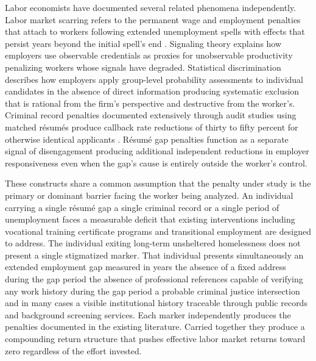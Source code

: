 \documentclass[12pt, letterpaper]{article}
\begin{document}
Labor economists have documented several related phenomena independently. Labor market scarring refers to the permanent wage and employment penalties that attach to workers following extended unemployment spells with effects that persist years beyond the initial spell's end \citep{arulampalam2001unemployment}. Signaling theory \citep{spence1973job} explains how employers use observable credentials as proxies for unobservable productivity penalizing workers whose signals have degraded. Statistical discrimination \citep{arrow1973higher,phelps1972statistical} describes how employers apply group-level probability assessments to individual candidates in the absence of direct information producing systematic exclusion that is rational from the firm's perspective and destructive from the worker's. Criminal record penalties documented extensively through audit studies using matched r\'{e}sum\'{e}s produce callback rate reductions of thirty to fifty percent for otherwise identical applicants \citep{pager2003mark}. R\'{e}sum\'{e} gap penalties function as a separate signal of disengagement producing additional independent reductions in employer responsiveness even when the gap's cause is entirely outside the worker's control.

These constructs share a common assumption that the penalty under study is the primary or dominant barrier facing the worker being analyzed. An individual carrying a single r\'{e}sum\'{e} gap a single criminal record or a single period of unemployment faces a measurable deficit that existing interventions including vocational training certificate programs and transitional employment are designed to address. The individual exiting long-term unsheltered homelessness does not present a single stigmatized marker. That individual presents simultaneously an extended employment gap measured in years the absence of a fixed address during the gap period the absence of professional references capable of verifying any work history during the gap period a probable criminal justice intersection and in many cases a visible institutional history traceable through public records and background screening services. Each marker independently produces the penalties documented in the existing literature. Carried together they produce a compounding return structure that pushes effective labor market returns toward zero regardless of the effort invested.
\end{document}
